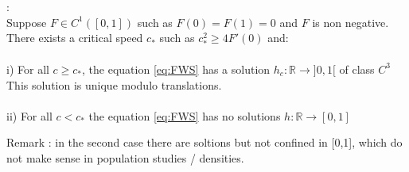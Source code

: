 \documentclass[17pt]{extarticle}
\begin{document}
\begin{theorem}:\\
Suppose $F \in C^1([0,1])$ such as $F(0)=F(1)=0$ and $F$ is non negative. There exists a critical speed $c_*$ such as $c_*^2 \geq 4F'(0)$ and: \\ \\
\vspace{5px} i) For all $c \geq c_*$, the equation \eqref{eq:FWS} has a solution $h_c:\mathbb{R} \rightarrow ]0,1[$ of class $C^3$ 
This solution is unique modulo translations. \\ \\ \vspace{5px}
ii) For all $c<c_*$ the equation \eqref{eq:FWS} has no solutions $h:\mathbb{R} \rightarrow [0,1]$
\end{theorem}
Remark : in the second case there are soltions but not confined in [0,1], which do not make sense in population studies / densities.

\newpage
\end{document}
